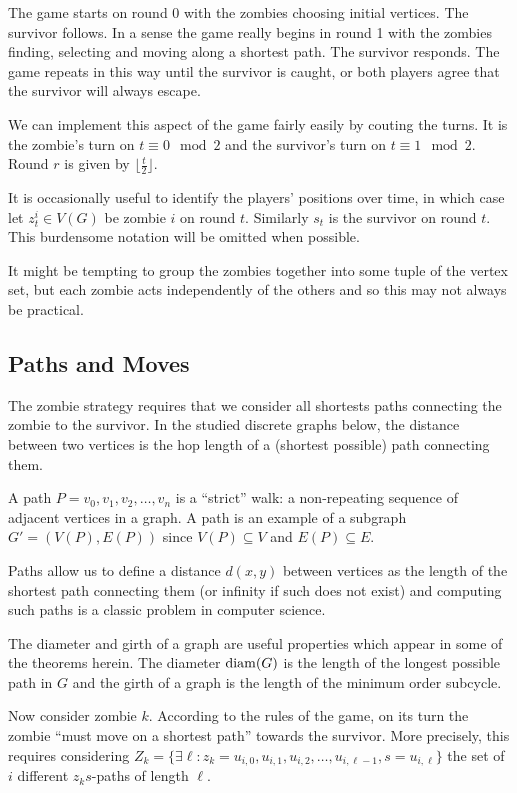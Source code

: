 The game starts on round 0 with the zombies choosing
initial vertices. The survivor follows. In a sense the game really begins in
round 1 with the zombies finding, selecting and moving along a shortest path.
The survivor responds. The game repeats in this way until the survivor is caught,
or both players agree that the survivor will always escape.

We can implement this aspect of the game fairly easily by couting the turns.
It is the zombie's turn on $t \equiv 0 \mod{2}$ and the survivor's turn on $t \equiv 1 \mod{2}$.
Round $r$ is given by $\lfloor \frac{t}{2} \rfloor$.

It is occasionally useful to identify the players' positions over time, in which
case let $z_t^i \in V(G)$ be zombie $i$ on round $t$. Similarly $s_t$ is the
survivor on round $t$. This burdensome notation will be omitted when possible.

It might be tempting to group the zombies together
into some tuple of the vertex set, but each zombie acts independently of
the others and so this may not always be practical.

\subsection{Paths and Moves}
The zombie strategy requires that we consider all shortests paths connecting
the zombie to the survivor.
In the studied discrete graphs below, the distance between two vertices is the hop length of a (shortest possible) path connecting them.

A path $P = v_0, v_1, v_2, \dots , v_n$ is a ``strict'' walk: a non-repeating sequence of
adjacent vertices in a graph. A path is an example of a subgraph $G' = (V(P), E(P))$ since $V(P) \subseteq V$ and $E(P) \subseteq E$.

Paths allow us to define a distance $d(x,y)$ between vertices as the length of the shortest path connecting them (or infinity if such does not exist) and computing such paths is a classic
problem in computer science.

The diameter and girth of a graph are useful properties which appear in some
of the theorems herein.
The diameter $\operatorname{diam}(G)$ is the length of the longest possible path in $G$ and the girth of a graph is the length of the minimum order subcycle.

Now consider zombie $k$. According to the rules of the game, on its turn the zombie
``must move on a shortest path'' towards the survivor. More precisely, this requires
considering $Z_k = \{  \exists \ell : z_k = u_{i,0}, u_{i, 1}, u_{i, 2}, \dots, u_{i, \ell-1}, s= u_{i, \ell}\}$ the set of $i$ different $z_ks$-paths of length $\ell$.

